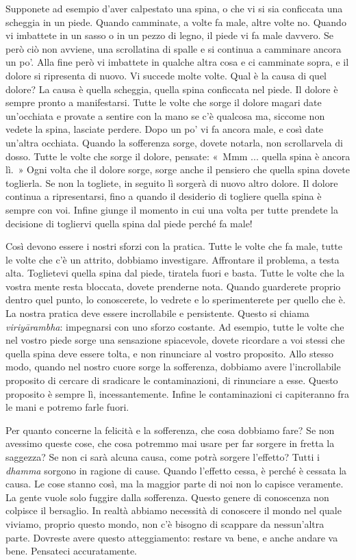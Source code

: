 Supponete ad esempio d'aver calpestato una spina, o che vi si sia
conficcata una scheggia in un piede. Quando camminate, a volte fa male,
altre volte no. Quando vi imbattete in un sasso o in un pezzo di legno,
il piede vi fa male davvero. Se però ciò non avviene, una scrollatina di
spalle e si continua a camminare ancora un po'. Alla fine però vi
imbattete in qualche altra cosa e ci camminate sopra, e il dolore si
ripresenta di nuovo. Vi succede molte volte. Qual è la causa di quel
dolore? La causa è quella scheggia, quella spina conficcata nel piede.
Il dolore è sempre pronto a manifestarsi. Tutte le volte che sorge il
dolore magari date un'occhiata e provate a sentire con la mano se c'è
qualcosa ma, siccome non vedete la spina, lasciate perdere. Dopo un po'
vi fa ancora male, e così date un'altra occhiata. Quando la sofferenza
sorge, dovete notarla, non scrollarvela di dosso. Tutte le volte che
sorge il dolore, pensate: «~Mmm ... quella spina è ancora lì.~» Ogni
volta che il dolore sorge, sorge anche il pensiero che quella spina
dovete toglierla. Se non la togliete, in seguito lì sorgerà di nuovo
altro dolore. Il dolore continua a ripresentarsi, fino a quando il
desiderio di togliere quella spina è sempre con voi. Infine giunge il
momento in cui una volta per tutte prendete la decisione di togliervi
quella spina dal piede perché fa male!

Così devono essere i nostri sforzi con la pratica. Tutte le volte che fa
male, tutte le volte che c'è un attrito, dobbiamo investigare.
Affrontare il problema, a testa alta. Toglietevi quella spina dal piede,
tiratela fuori e basta. Tutte le volte che la vostra mente resta
bloccata, dovete prenderne nota. Quando guarderete proprio dentro quel
punto, lo conoscerete, lo vedrete e lo sperimenterete per quello che è.
La nostra pratica deve essere incrollabile e persistente. Questo si
chiama \emph{viriyārambha}: impegnarsi con uno sforzo costante. Ad
esempio, tutte le volte che nel vostro piede sorge una sensazione
spiacevole, dovete ricordare a voi stessi che quella spina deve essere
tolta, e non rinunciare al vostro proposito. Allo stesso modo, quando
nel nostro cuore sorge la sofferenza, dobbiamo avere l'incrollabile
proposito di cercare di sradicare le contaminazioni, di rinunciare a
esse. Questo proposito è sempre lì, incessantemente. Infine le
contaminazioni ci capiteranno fra le mani e potremo farle fuori.

Per quanto concerne la felicità e la sofferenza, che cosa dobbiamo fare?
Se non avessimo queste cose, che cosa potremmo mai usare per far sorgere
in fretta la saggezza? Se non ci sarà alcuna causa, come potrà sorgere
l'effetto? Tutti i \emph{dhamma} sorgono in ragione di cause. Quando
l'effetto cessa, è perché è cessata la causa. Le cose stanno così, ma la
maggior parte di noi non lo capisce veramente. La gente vuole solo
fuggire dalla sofferenza. Questo genere di conoscenza non colpisce il
bersaglio. In realtà abbiamo necessità di conoscere il mondo nel quale
viviamo, proprio questo mondo, non c'è bisogno di scappare da
nessun'altra parte. Dovreste avere questo atteggiamento: restare va
bene, e anche andare va bene. Pensateci accuratamente.

